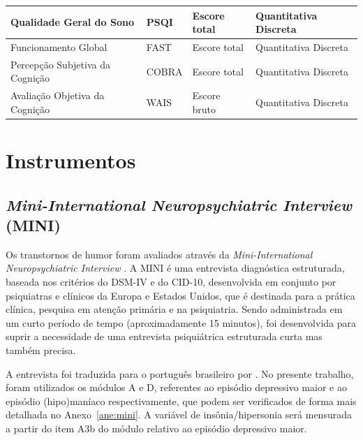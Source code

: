 \documentclass[chapter=TITLE,
               oneside,
               12pt,
               a4paper,
               english,
               brazil]{abntex2}    %
\begin{document}
\begin{table}[H]
{\begin{tabular}{@{}llll@{}}
            Qualidade Geral do Sono &
            PSQI & Escore total & Quantitativa Discreta
            \\ \midrule
            Funcionamento Global &
            FAST & Escore total & Quantitativa Discreta
            \\ \midrule
            Percepção Subjetiva da Cognição &
            COBRA & Escore total & Quantitativa Discreta
            \\ \midrule
            Avaliação Objetiva da Cognição &
            WAIS & Escore bruto & Quantitativa Discreta
            \\ \bottomrule
        \end{tabular}%
        }
        \end{table}

    \section{Instrumentos}\label{sec:instrumentos}
    
        \subsection{\textit{Mini-International Neuropsychiatric Interview} (MINI)}
        \label{sec:mini}
    
            Os transtornos de humor foram avaliados através da
            \textit{Mini-International Neuropsychiatric Interview}
            \parencite{sheehan_mini-international_1998}.
            A MINI é uma entrevista diagnóstica estruturada,
            baseada nos critérios do DSM-IV e do CID-10,
            desenvolvida em conjunto por psiquiatras e clínicos
            da Europa e Estados Unidos,
            que é destinada para a prática clínica, pesquisa em atenção primária
            e na psiquiatria.
            Sendo administrada em um curto período de tempo (aproximadamente 15 minutos),
            foi desenvolvida para suprir a necessidade de uma entrevista psiquiátrica
            estruturada curta mas também precisa.
    
            A entrevista foi traduzida para o português brasileiro por
            \textcite{amorim_mini_2000}.
            No presente trabalho, foram utilizados os módulos A e D, referentes
            ao episódio depressivo maior e ao episódio (hipo)maníaco respectivamente,
            que podem ser verificados de forma mais detalhada no Anexo~\ref{ane:mini}.
            A variável de insônia/hipersonia será mensurada a partir do item A3b do
            módulo relativo ao episódio depressivo maior. 
    
\end{document}
